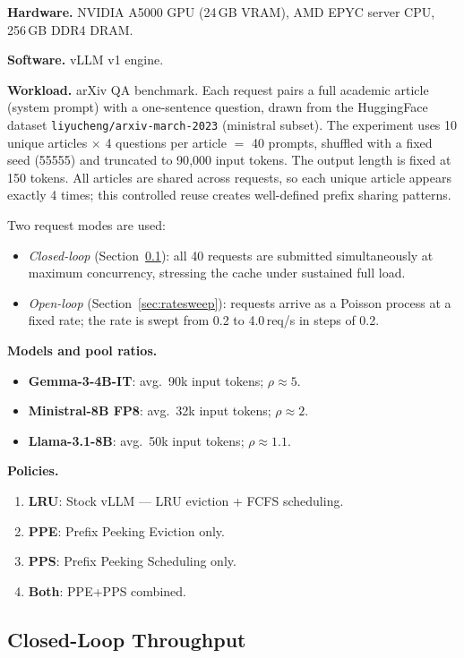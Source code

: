 \documentclass[journal]{IEEEtran}
\newcommand{\ppe}{\textsc{PPE}}
\newcommand{\pps}{\textsc{PPS}}
\begin{document}
\textbf{Hardware.}  NVIDIA A5000 GPU (24\,GB VRAM), AMD EPYC server CPU,
256\,GB DDR4 DRAM.

\textbf{Software.}  vLLM v1 engine.

\textbf{Workload.}  arXiv QA benchmark.  Each request pairs a full academic
article (system prompt) with a one-sentence question, drawn from the
HuggingFace dataset \texttt{liyucheng/arxiv-march-2023} (ministral subset).
The experiment uses 10 unique articles $\times$ 4 questions per article $=$ 40
prompts, shuffled with a fixed seed (55555) and truncated to 90{,}000 input
tokens.  The output length is fixed at 150 tokens.  All articles are shared
across requests, so each unique article appears exactly 4 times; this
controlled reuse creates well-defined prefix sharing patterns.

Two request modes are used:
\begin{itemize}
\item \emph{Closed-loop} (Section~\ref{sec:closed}): all 40 requests are
      submitted simultaneously at maximum concurrency, stressing the cache
      under sustained full load.
\item \emph{Open-loop} (Section~\ref{sec:ratesweep}): requests arrive as a
      Poisson process at a fixed rate; the rate is swept from 0.2 to
      4.0\,req/s in steps of 0.2.
\end{itemize}

\textbf{Models and pool ratios.}
\begin{itemize}
\item \textbf{Gemma-3-4B-IT}: avg.\ 90k input tokens; $\rho\approx5$.
\item \textbf{Ministral-8B FP8}: avg.\ 32k input tokens; $\rho\approx2$.
\item \textbf{Llama-3.1-8B}: avg.\ 50k input tokens; $\rho\approx1.1$.
\end{itemize}

\textbf{Policies.}
\begin{enumerate}
\item \textbf{LRU}: Stock vLLM — LRU eviction + FCFS scheduling.
\item \textbf{\ppe}: Prefix Peeking Eviction only.
\item \textbf{\pps}: Prefix Peeking Scheduling only.
\item \textbf{Both}: \ppe{}+\pps{} combined.
\end{enumerate}

\subsection{Closed-Loop Throughput}
\label{sec:closed}
\end{document}
